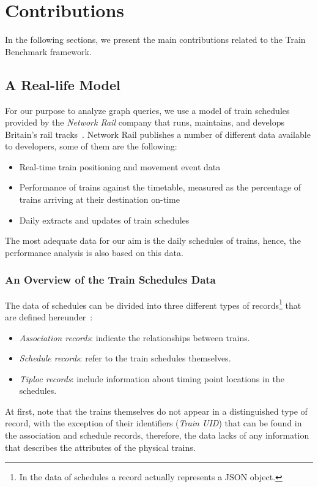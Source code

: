 \chapter{Contributions}

In the following sections, we present the main contributions related to the Train Benchmark framework.

\section{A Real-life Model}

For our purpose to analyze graph queries, we use a model of train schedules provided by the \textit{Network Rail} company that runs, maintains, and develops Britain's rail tracks~\cite{network_rail}. Network Rail publishes a number of different data available to developers, some of them are the following:
\begin{itemize}
	\item{Real-time train positioning and movement event data}
	\item{Performance of trains against the timetable, measured as the percentage of trains arriving at their destination on-time}
	\item{Daily extracts and updates of train schedules}
\end{itemize}

The most adequate data for our aim is the daily schedules of trains, hence, the performance analysis is also based on this data.

\subsection{An Overview of the Train Schedules Data}\label{sec:schedules_overview}
The data of schedules can be divided into three different types of records\footnote{In the data of schedules a record actually represents a JSON object.} that are defined hereunder~\cite{schedules_data}:
\begin{itemize}
	\item{\textit{Association records}}: indicate the relationships between trains.
	\item{\textit{Schedule records}}: refer to the train schedules themselves.
	\item{\textit{Tiploc records}}: include information about timing point locations in the schedules.
\end{itemize}

At first, note that the trains themselves do not appear in a distinguished type of record, with the exception of their identifiers (\textit{Train UID}) that can be found in the association and schedule records, therefore, the data lacks of any information that describes the attributes of the physical trains.


